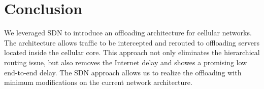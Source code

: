 \section{Conclusion}
We leveraged SDN to introduce an offloading architecture for 
cellular networks. The architecture allows traffic to be intercepted 
and rerouted to offloading servers located inside the cellular core. 
This approach not only eliminates the hierarchical routing issue, but also 
removes the Internet delay and showes a promising low end-to-end delay. 
The SDN approach allows us to realize the offloading with minimum modifications on 
the current network architecture. 
